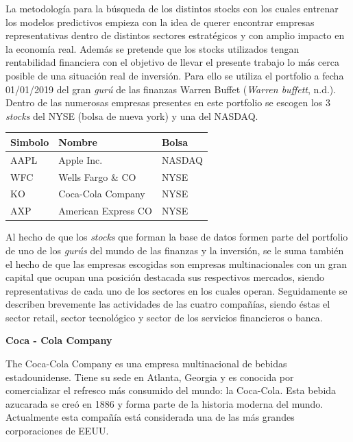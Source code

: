 \documentclass[]{DissertateUSU}
\begin{document}
\setlength\parskip{5ex}

\noindent La metodología para la búsqueda de los distintos stocks con
los cuales entrenar los modelos predictivos empieza con la idea de
querer encontrar empresas representativas dentro de distintos sectores
estratégicos y con amplio impacto en la economía real. Además se
pretende que los stocks utilizados tengan rentabilidad financiera con el
objetivo de llevar el presente trabajo lo más cerca posible de una
situación real de inversión. Para ello se utiliza el portfolio a fecha
01/01/2019 del gran \emph{gurú} de las finanzas Warren Buffet
(\emph{Warren buffett}, n.d.). Dentro de las numerosas empresas
presentes en este portfolio se escogen los 3 \emph{stocks} del NYSE
(bolsa de nueva york) y una del NASDAQ.

\begin{table}[H]
\centering\begingroup\fontsize{10}{12}\selectfont

\begin{tabular}{l|l|l}
\hline
Simbolo & Nombre & Bolsa\\
\hline
AAPL & Apple Inc. & NASDAQ\\
\hline
WFC & Wells Fargo \& CO & NYSE\\
\hline
KO & Coca-Cola Company & NYSE\\
\hline
AXP & American Express CO & NYSE\\
\hline
\end{tabular}
\endgroup{}
\end{table}
\centering

\setlength\parskip{7ex}
\justifying

\noindent Al hecho de que los \emph{stocks} que forman la base de datos
formen parte del portfolio de uno de los \emph{gurús} del mundo de las
finanzas y la inversión, se le suma también el hecho de que las empresas
escogidas son empresas multinacionales con un gran capital que ocupan
una posición destacada sus respectivos mercados, siendo representativas
de cada uno de los sectores en los cuales operan. Seguidamente se
describen brevemente las actividades de las cuatro compañías, siendo
éstas el sector retail, sector tecnológico y sector de los servicios
financieros o banca.

\textbf{Coca - Cola Company}

\noindent The Coca-Cola Company es una empresa multinacional de bebidas
estadounidense. Tiene su sede en Atlanta, Georgia y es conocida por
comercializar el refresco más consumido del mundo: la Coca-Cola. Esta
bebida azucarada se creó en 1886 y forma parte de la historia moderna
del mundo. Actualmente esta compañía está considerada una de las más
grandes corporaciones de EEUU.
\end{document}
